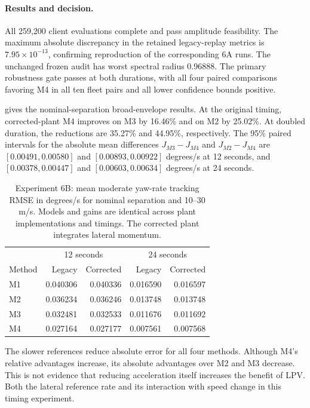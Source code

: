 \paragraph{Results and decision.}
All 259,200 client evaluations complete and pass amplitude feasibility.
The maximum absolute discrepancy in the retained legacy-replay metrics is
$7.95\times10^{-13}$, confirming reproduction of the corresponding 6A runs.
The unchanged frozen audit has worst spectral radius 0.96888. The primary
robustness gate passes at both durations, with all four paired comparisons
favoring M4 in all ten fleet pairs and all lower confidence bounds positive.

 gives the nominal-separation broad-envelope results.
At the original timing, corrected-plant M4 improves on M3 by 16.46\% and on
M2 by 25.02\%. At doubled duration, the reductions are 35.27\% and 44.95\%,
respectively. The 95\% paired intervals for the absolute mean differences
$J_{M3}-J_{M4}$ and $J_{M2}-J_{M4}$ are $[0.00491,0.00580]$ and
$[0.00893,0.00922]$ degrees/s at 12 seconds, and $[0.00378,0.00447]$ and
$[0.00603,0.00634]$ degrees/s at 24 seconds.

\begin{table}[htbp]
\centering
\caption{Experiment 6B: mean moderate yaw-rate tracking RMSE in degrees/s for
nominal separation and 10--30 m/s. Models and gains are identical across plant
implementations and timings. The corrected plant integrates lateral momentum.}
\label{tab:6b-tracking}
\begin{tabular}{lrrrr}
\toprule
 & \multicolumn{2}{c}{12 seconds} & \multicolumn{2}{c}{24 seconds}\\
Method & Legacy & Corrected & Legacy & Corrected\\
\midrule
M1 & 0.040306 & 0.040336 & 0.016590 & 0.016597\\
M2 & 0.036234 & 0.036246 & 0.013748 & 0.013748\\
M3 & 0.032481 & 0.032533 & 0.011676 & 0.011692\\
M4 & 0.027164 & 0.027177 & 0.007561 & 0.007568\\
\bottomrule
\end{tabular}
\end{table}

The slower references reduce absolute error for all four methods. Although
M4's relative advantages increase, its absolute advantages over M2 and M3
decrease. This is not evidence that reducing acceleration itself increases the
benefit of LPV. Both the lateral reference rate and its interaction with speed
change in this timing experiment.

